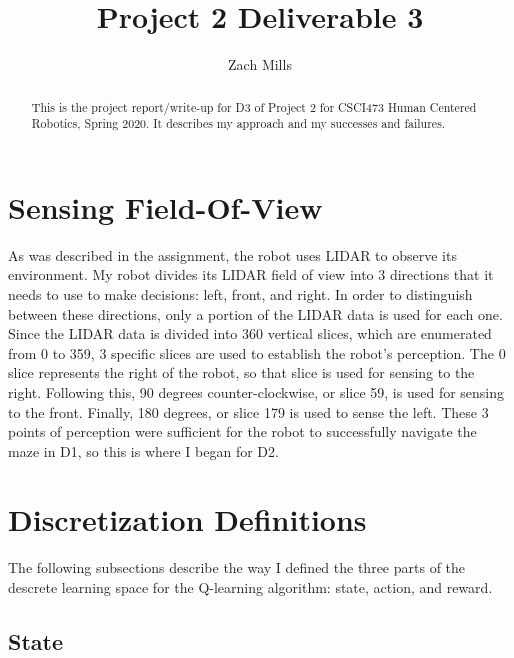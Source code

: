 \documentclass[letterpaper, 10 pt, conference]{ieeeconf}  %
\title{\LARGE \bf
Project 2 Deliverable 3
}
\author{Zach Mills}%
\begin{document}
\maketitle
\thispagestyle{empty}
\pagestyle{empty}


\begin{abstract}

This is the project report/write-up for D3 of Project 2 for CSCI473 Human Centered Robotics, Spring 2020. It describes my approach and my successes and failures.
\end{abstract}


\section{Sensing Field-Of-View}

As was described in the assignment, the robot uses LIDAR to observe its environment. My robot divides its LIDAR field of view into 3 directions that it needs to use to make decisions: left, front, and right. In order to distinguish between these directions, only a portion of the LIDAR data is used for each one. Since the LIDAR data is divided into 360 vertical slices, which are enumerated from 0 to 359, 3 specific slices are used to establish the robot's perception. The 0 slice represents the right of the robot, so that slice is used for sensing to the right. Following this, 90 degrees counter-clockwise, or slice 59, is used for sensing to the front. Finally, 180 degrees, or slice 179 is used to sense the left. These 3 points of perception were sufficient for the robot to successfully navigate the maze in D1, so this is where I began for D2.

\section{Discretization Definitions}

The following subsections describe the way I defined the three parts of the descrete learning space for the Q-learning algorithm: state, action, and reward.

\subsection{State}
\end{document}

